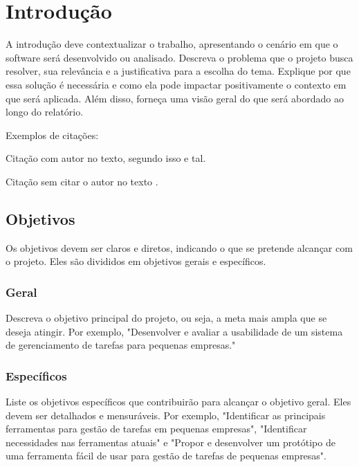 \chapter{Introdução}

A introdução deve contextualizar o trabalho, apresentando o cenário em que o software será desenvolvido ou analisado. Descreva o problema que o projeto busca resolver, sua relevância e a justificativa para a escolha do tema. Explique por que essa solução é necessária e como ela pode impactar positivamente o contexto em que será aplicada. Além disso, forneça uma visão geral do que será abordado ao longo do relatório.

Exemplos de citações:

Citação com autor no texto, segundo \textcite{araujo2012} isso e tal.

Citação sem citar o autor no texto \cite{araujo2012}.




\section{Objetivos}

Os objetivos devem ser claros e diretos, indicando o que se pretende alcançar com o projeto. Eles são divididos em objetivos gerais e específicos.

\subsection{Geral}

Descreva o objetivo principal do projeto, ou seja, a meta mais ampla que se deseja atingir. Por exemplo, "Desenvolver e avaliar a usabilidade de um sistema de gerenciamento de tarefas para pequenas empresas."

\subsection{Específicos}

Liste os objetivos específicos que contribuirão para alcançar o objetivo geral. Eles devem ser detalhados e mensuráveis. Por exemplo, "Identificar as principais ferramentas para gestão de tarefas em pequenas empresas", "Identificar necessidades nas ferramentas atuais" e "Propor e desenvolver um protótipo de uma ferramenta fácil de usar para gestão de tarefas de pequenas empresas".